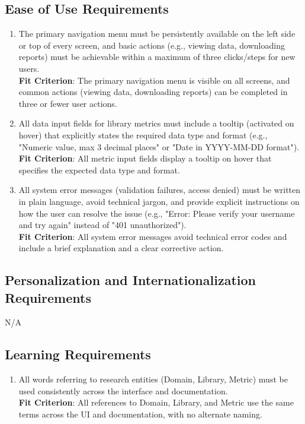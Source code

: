 \documentclass[12pt]{article}
\begin{document}
\subsection{Ease of Use Requirements}
\begin{enumerate}[label=UH-EU\arabic*]
  \item The primary navigation menu must be persistently available on the left side or top of every screen, and basic actions (e.g., viewing data, downloading reports) must be achievable within a maximum of three clicks/steps for new users.
  \\ \textbf{Fit Criterion}: The primary navigation menu is visible on all screens, and common actions (viewing data, downloading reports) can be completed in three or fewer user actions.
  \item All data input fields for library metrics must include a tooltip (activated on hover) that explicitly states the required data type and format (e.g., "Numeric value, max 3 decimal places" or "Date in YYYY-MM-DD format").
  \\ \textbf{Fit Criterion}: All metric input fields display a tooltip on hover that specifies the expected data type and format.
  \item All system error messages (validation failures, access denied) must be written in plain language, avoid technical jargon, and provide explicit instructions on how the user can resolve the issue (e.g., "Error: Please verify your username and try again" instead of "401 unauthorized").
  \\ \textbf{Fit Criterion}: All system error messages avoid technical error codes and include a brief explanation and a clear corrective action.
\end{enumerate}
\subsection{Personalization and Internationalization Requirements}
N/A
\subsection{Learning Requirements}
\begin{enumerate}[label=UH-LR\arabic*]
\item All words referring to research entities (Domain, Library, Metric) must be used consistently across the interface and documentation.
  \\ \textbf{Fit Criterion}: All references to Domain, Library, and Metric use the same terms across the UI and documentation, with no alternate naming.
\end{enumerate}
\end{document}
